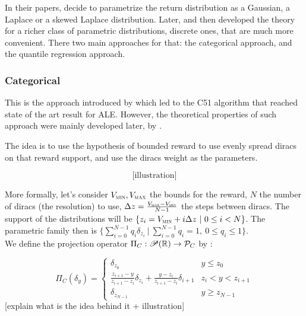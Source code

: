In their papers, \cite[Morimura et al.]{morimura_parametric_2012} decide to parametrize the return distribution as a Gaussian, a Laplace or a skewed Laplace distribution. Later, \cite[Bellemare et al.]{bellemare_distributional_2017} and then \cite[Dabney et al.]{dabney_distributional_2017} developed the theory for a richer class of parametric distributions, discrete ones, that are much more convenient. There two main approaches for that: the categorical approach, and the quantile regression approach.

\subsubsection*{Categorical}

This is the approach introduced by \cite[Bellemare et al.]{bellemare_distributional_2017} which led to the C51 algorithm that reached state of the art result for ALE. However, the theoretical properties of such approach were mainly developed later, by \cite[Rowland et al.]{rowland_analysis_2018}.

The idea is to use the hypothesis of bounded reward to use evenly spread diracs on that reward support, and use the diracs weight as the parameters.

\[\text{[illustration]}\]

More formally, let’s consider $V_{\textsc{min}}, V_{\textsc{max}}$ the bounds for the reward, $N$ the number of diracs (the resolution) to use, $\Delta z = \frac{V_{\textsc{max}} - V_{\textsc{min}}}{N - 1}$ the steps between diracs. The support of the distributions will be $\{ z_i = V_{\textsc{\textsc{min}}} + i\Delta z \ |\ 0 \leq i < N \}$. The parametric family then is $\{ \sum_{i=0}^{N-1} q_i\delta_{z_i}  \ |\ \sum_{i=0}^{N-1} q_i = 1,\ 0\leq q_i \leq 1\}$.\\


We define the projection operator $\Pi_C : \mathscr{P}(\mathbb{R}) \rightarrow \mathcal{P}_C$ by :

\begin{equation}
    \Pi_C(\delta_y) = 
    \begin{cases}
        \delta_{z_0} & y \leq z_0\\
        \frac{z_{i+1}-y}{z_{i+1}-z_{i}}\delta_{z_i} + \frac{y - z_i}{z_{i+1}-z_{i}}\delta_{i+1} & z_i < y < z_{i+1}\\
        \delta_{z_{N-1}} & y \geq z_{N-1}
    \end{cases}
\end{equation}
[explain what is the idea behind it + illustration]

